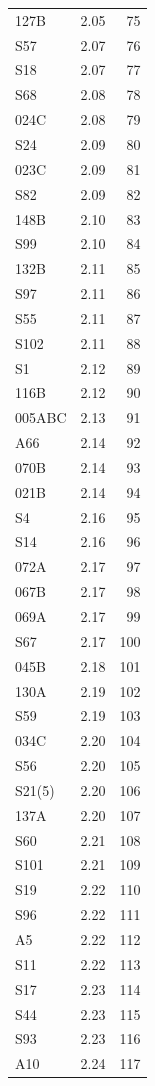 \begin{longtable}{lrr}
  127B & 2.05 & 75 \\
  S57 & 2.07 & 76 \\
  S18 & 2.07 & 77 \\
  S68 & 2.08 & 78 \\
  024C & 2.08 & 79 \\
  S24 & 2.09 & 80 \\
  023C & 2.09 & 81 \\
  S82 & 2.09 & 82 \\
  148B & 2.10 & 83 \\
  S99 & 2.10 & 84 \\
  132B & 2.11 & 85 \\
  S97 & 2.11 & 86 \\
  S55 & 2.11 & 87 \\
  S102 & 2.11 & 88 \\
  S1 & 2.12 & 89 \\
  116B & 2.12 & 90 \\
  005ABC & 2.13 & 91 \\
  A66 & 2.14 & 92 \\
  070B & 2.14 & 93 \\
  021B & 2.14 & 94 \\
  S4 & 2.16 & 95 \\
  S14 & 2.16 & 96 \\
  072A & 2.17 & 97 \\
  067B & 2.17 & 98 \\
  069A & 2.17 & 99 \\
  S67 & 2.17 & 100 \\
  045B & 2.18 & 101 \\
  130A & 2.19 & 102 \\
  S59 & 2.19 & 103 \\
  034C & 2.20 & 104 \\
  S56 & 2.20 & 105 \\
  S21(5) & 2.20 & 106 \\
  137A & 2.20 & 107 \\
  S60 & 2.21 & 108 \\
  S101 & 2.21 & 109 \\
  S19 & 2.22 & 110 \\
  S96 & 2.22 & 111 \\
  A5 & 2.22 & 112 \\
  S11 & 2.22 & 113 \\
  S17 & 2.23 & 114 \\
  S44 & 2.23 & 115 \\
  S93 & 2.23 & 116 \\
  A10 & 2.24 & 117 \\

\end{longtable}
